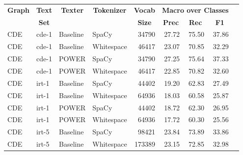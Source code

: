 \begin{tabular}{| l | l | l | l | r | r | r | r | r |}
    \hline

    \multicolumn{1}{|c|}{\textbf{Graph}} &
    \multicolumn{1}{|c|}{\textbf{Text}} &
    \multicolumn{1}{|c|}{\textbf{Texter}} &
    \multicolumn{1}{|c|}{\textbf{Tokenizer}} &
    \multicolumn{1}{|c|}{\textbf{Vocab}} &
    \multicolumn{3}{|c|}{\textbf{Macro over Classes}} \\

    \multicolumn{1}{|c|}{} &
    \multicolumn{1}{|c|}{\textbf{Set}} &
    \multicolumn{1}{|c|}{} &
    \multicolumn{1}{|c|}{} &
    \multicolumn{1}{|c|}{\textbf{Size}} &
    \multicolumn{1}{|c|}{\textbf{Prec}} &
    \multicolumn{1}{|c|}{\textbf{Rec}} &
    \multicolumn{1}{|c|}{\textbf{F1}} \\

    \hline \hline

    CDE & cde-1 & Baseline & SpaCy & \num{34790} &
    27.72 & 75.50 & 37.86 \\

    CDE & cde-1 & Baseline & Whitespace & \num{46417} &
    23.07 & 70.85 & 32.29 \\

    CDE & cde-1 & POWER & SpaCy & \num{34790} &
    27.25 & 75.64 & 37.33 \\

    CDE & cde-1 & POWER & Whitespace & \num{46417} &
    22.85 & 70.82 & 32.60 \\

    \hline

    CDE & irt-1 & Baseline & SpaCy & \num{44402} &
    19.20 & 62.83 & 27.49 \\

    CDE & irt-1 & Baseline & Whitespace & \num{64936} &
    18.03 & 60.58 & 25.87 \\

    CDE & irt-1 & POWER & SpaCy & \num{44402} & 
    18.72 & 62.30 & 26.95 \\

    CDE & irt-1 & POWER & Whitespace & \num{64936} &
    17.72 & 60.30 & 25.56 \\

    \hline

    CDE & irt-5 & Baseline & SpaCy & \num{98421} &
    23.84 & 73.89 & 33.86 \\

    CDE & irt-5 & Baseline & Whitespace & \num{173389} &
    23.15 & 72.85 & 32.98 \\


\end{tabular}
